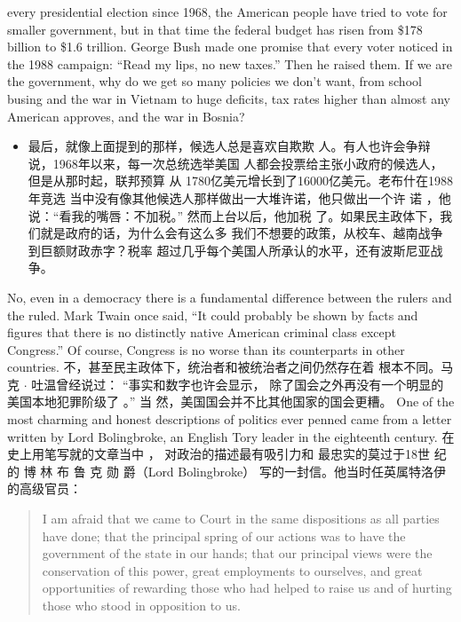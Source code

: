 \begin{paracol}{2}
\begin{itemize}
	every presidential election since 1968, the American people
	have tried to vote for smaller government, but in that time the
	federal budget has risen from \$178 billion to \$1.6 trillion.
	George Bush made one promise that every voter noticed in the
	1988 campaign: ``Read my lips, no new taxes.'' Then he raised
	them. If we are the government, why do we get so many policies we don't want, from school busing and the war in Vietnam
	to huge deficits, tax rates higher than almost any American approves, and the war in Bosnia?
\end{itemize}
\switchcolumn
\begin{itemize}
	\item 最后，就像上面提到的那样，候选人总是喜欢自欺欺
	人。有人也许会争辩说，1968年以来，每一次总统选举美国
	人都会投票给主张小政府的候选人，但是从那时起，联邦预算
	从 1780亿美元增长到了16000亿美元。老布什在1988年竞选
	当中没有像其他候选人那样做出一大堆许诺，他只做出一个许
	诺 ，他说：“看我的嘴唇：不加税。” 然而上台以后，他加税
	了。如果民主政体下，我们就是政府的话，为什么会有这么多
	我们不想要的政策，从校车、越南战争到巨额财政赤字？税率
	超过几乎每个美国人所承认的水平，还有波斯尼亚战争。
\end{itemize}
\switchcolumn*
No, even in a democracy there is a fundamental difference
between the rulers and the ruled. Mark Twain once said, ``It
could probably be shown by facts and figures that there is no
distinctly native American criminal class except Congress.'' Of
course, Congress is no worse than its counterparts in other
countries.
\switchcolumn
不，甚至民主政体下，统治者和被统治者之间仍然存在着
根本不同。马 克 $\cdot$ 吐温曾经说过： “事实和数字也许会显示，
除了国会之外再没有一个明显的美国本地犯罪阶级了 。” 当
然，美国国会并不比其他国家的国会更糟。
\switchcolumn*
One of the most charming and honest descriptions of politics
ever penned came from a letter written by Lord Bolingbroke,
an English Tory leader in the eighteenth century.
\switchcolumn
在史上用笔写就的文章当中 ， 对政治的描述最有吸引力和
最忠实的莫过于18世 纪 的 博 林 布 鲁 克 勋 爵（Lord Bolingbroke） 写的一封信。他当时任英属特洛伊的高级官员：
\switchcolumn*
\begin{quote}
I am afraid that we came to Court in the same dispositions as all
parties have done; that the principal spring of our actions was to
have the government of the state in our hands; that our principal views were the conservation of this power, great employments to ourselves, and great opportunities of rewarding those who had helped to raise us and of hurting those who stood in opposition to us.

\end{quote}
\end{paracol}
